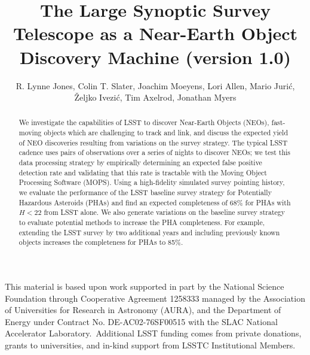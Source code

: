 \documentclass[12pt,preprint]{aastex}
\begin{document}
\title{The Large Synoptic Survey Telescope as a Near-Earth Object Discovery Machine (version 1.0)}

\author{R. Lynne Jones,
Colin T. Slater,
Joachim Moeyens,
Lori Allen,
Mario Juri\'{c},
\v{Z}eljko Ivezi\'{c},
Tim Axelrod,
Jonathan Myers
}

\begin{abstract}
We investigate the capabilities of LSST to discover Near-Earth Objects (NEOs), fast-moving objects
which are challenging to track and link, and discuss the expected yield of NEO discoveries
resulting from variations on the survey strategy. The typical LSST cadence uses pairs of observations
over a series of nights to discover NEOs; we test this data processing strategy by empirically determining 
an expected false positive detection rate and validating that this rate is tractable with the Moving Object
Processing Software (MOPS).  Using a high-fidelity simulated survey pointing history, we evaluate the 
performance of the LSST baseline survey strategy for Potentially Hazardous Asteroids (PHAs) and 
find an expected completeness of 68\% for PHAs with $H<22$ from LSST alone. We also generate variations
on the baseline survey strategy to evaluate potential methods to increase the PHA completeness. For example,
extending the LSST survey by two additional years and including previously known objects increases the 
completeness for PHAs to 85\%. 
\end{abstract}














\acknowledgements
This material is based upon work supported in part by the National Science
Foundation through Cooperative Agreement 1258333 managed by the Association of
Universities for Research in Astronomy (AURA), and the Department of Energy
under Contract No. DE-AC02-76SF00515 with the SLAC National Accelerator
Laboratory. Additional LSST funding comes from private donations, grants to
universities, and in-kind support from LSSTC Institutional Members.

\appendix


% 


\end{document}
